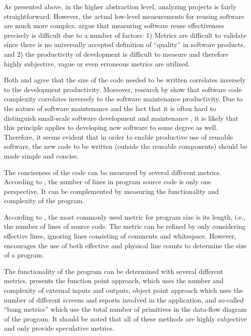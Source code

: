 As presented above, in the higher abstraction level, analyzing projects is fairly straightforward. However, the actual low-level measurements for reusing software are much more complex. \citet{mohagheghi_quality_2007} argue that measuring software reuse effectiveness precisely is difficult due to a number of factors: 1) Metrics are difficult to validate since there is no universally accepted definition of ``quality'' in software products, and 2) the productivity of development is difficult to measure and therefore highly subjective, vague or even erroneous metrics are utilized.

Both \citet{frakes_software_1996} and \citet{mohagheghi_quality_2007} agree that the size of the code needed to be written correlates inversely to the development productivity. Moreover, research by \citet{banker_software_1993,gill_cyclomatic_1991} show that software code complexity correlates inversely to the software maintenance productivity. Due to the nature of software maintenance and the fact that it is often hard to distinguish small-scale software development and maintenance \citep{chapin_types_2001}, it is likely that this principle applies to developing new software to some degree as well. Therefore, it seems evident that in order to enable productive use of reusable software, the new code to be written (outside the reusable components) should be made simple and concise.

The conciseness of the code can be measured by several different metrics. According to \citet{fenton_software_1998}, the number of lines in program source code is only one perspective. It can be complemented by measuring the functionality and complexity of the program.

According to \citet{fenton_software_1998}, the most commonly used metric for program size is its length, i.e., the number of lines of source code. The metric can be refined by only considering effective lines, ignoring lines consisting of comments and whitespace. However, \citet{fenton_software_1998} encourages the use of both effective and physical line counts to determine the size of a program.

The functionality of the program can be determined with several different metrics. \citet{fenton_software_1998} presents the function point approach, which uses the number and complexity of external inputs and outputs, object point approach which uses the number of different screens and reports involved in the application, and so-called ``bang metrics'' which use the total number of primitives in the data-flow diagram of the program. It should be noted that all of these methods are highly subjective and only provide speculative metrics.

